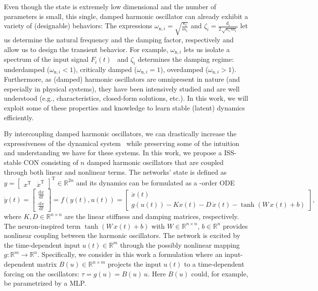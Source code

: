 Even though the state is extremely low dimensional and the number of parameters is small, this single, damped harmonic oscillator can already exhibit a variety of (designable) behaviors:
The expressions $\omega_{\mathrm{n},i} = \sqrt{\frac{\kappa_i}{m_i}}$ and $\zeta_i = \frac{d_i}{2 \, \sqrt{\kappa_i \, m_i}}$ let us determine the natural frequency and the damping factor, respectively and allow us to design the transient behavior. For example, $\omega_{\mathrm{n},i}$ lets us isolate a spectrum of the input signal $F_i(t)$~\citep{ceni2024random} and $\zeta_i$ determines the damping regime: underdamped ($\omega_{\mathrm{n},i} < 1$), critically damped ($\omega_{\mathrm{n},i} = 1$), overdamped ($\omega_{\mathrm{n},i} > 1$). 
Furthermore, as (damped) harmonic oscillators are omnipresent in nature (and especially in physical systems), they have been intensively studied and are well understood (e.g., characteristics, closed-form solutions, etc.). 
In this work, we will exploit some of these properties and knowledge to learn stable (latent) dynamics efficiently.

By intercoupling damped harmonic oscillators, we can drastically increase the expressiveness of the dynamical system~\citep{rusch2020coupled, ceni2024random, lanthaler2024neural} while preserving some of the intuition and understanding we have for these systems. In this work, we propose a \gls{ISS}-stable \gls{CON} consisting of $n$ damped harmonic oscillators that are coupled through both linear and nonlinear terms. The networks' state is defined as $y = \begin{bmatrix}
    x^\mathrm{T} & \dot{x}^\mathrm{T}
\end{bmatrix}^\mathrm{T} \in \mathbb{R}^{2n}$ and its dynamics can be formulated as a -order \gls{ODE}
\begin{equation}\label{eq:con:con_dynamics}
    \dot{y}(t) = \begin{bmatrix}
        \frac{\mathrm{d}x}{\mathrm{d}t}\\
        \frac{\mathrm{d}\dot{x}}{\mathrm{d}t}
    \end{bmatrix} = f(y(t), u(t)) = \begin{bmatrix}
        \dot{x}(t)\\
        g(u(t)) -K x(t) - D \, \dot{x}(t) - \tanh(W \, x(t) + b)
    \end{bmatrix},
\end{equation}
where $K, D \in \mathbb{R}^{n \times n}$ are the linear stiffness and damping matrices, respectively. The neuron-inspired term $\tanh(W \, x(t) + b)$ with $W \in \mathbb{R}^{n \times n}$, $b \in \mathbb{R}^n$ provides nonlinear coupling between the harmonic oscillators.
The network is excited by the time-dependent input $u(t) \in \mathbb{R}^m$ through the possibly nonlinear mapping $g: \mathbb{R}^m \to \mathbb{R}^n$.
Specifically, we consider in this work a formulation where an input-dependent matrix $B(u) \in \mathbb{R}^{n \times m}$ projects the input $u(t)$ to a time-dependent forcing on the oscillators: $\tau = g(u) = B(u) \, u$. Here $B(u)$ could, for example, be parametrized by a \gls{MLP}.

